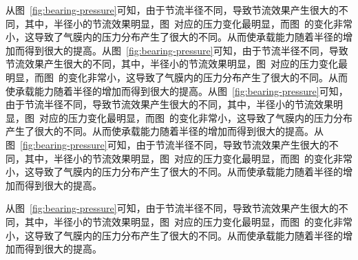 从图~\ref{fig:bearing-pressure}可知，由于节流半径不同，导致节流效果产生很大的不同，其中，半径小的节流效果明显，图~对应的压力变化最明显，而图~的变化非常小，这导致了气膜内的压力分布产生了很大的不同。从而使承载能力随着半径的增加而得到很大的提高。从图~\ref{fig:bearing-pressure}可知，由于节流半径不同，导致节流效果产生很大的不同，其中，半径小的节流效果明显，图~对应的压力变化最明显，而图~的变化非常小，这导致了气膜内的压力分布产生了很大的不同。从而使承载能力随着半径的增加而得到很大的提高。从图~\ref{fig:bearing-pressure}可知，由于节流半径不同，导致节流效果产生很大的不同，其中，半径小的节流效果明显，图~对应的压力变化最明显，而图~的变化非常小，这导致了气膜内的压力分布产生了很大的不同。从而使承载能力随着半径的增加而得到很大的提高。从图~\ref{fig:bearing-pressure}可知，由于节流半径不同，导致节流效果产生很大的不同，其中，半径小的节流效果明显，图~对应的压力变化最明显，而图~的变化非常小，这导致了气膜内的压力分布产生了很大的不同。从而使承载能力随着半径的增加而得到很大的提高。

从图~\ref{fig:bearing-pressure}可知，由于节流半径不同，导致节流效果产生很大的不同，其中，半径小的节流效果明显，图~对应的压力变化最明显，而图~的变化非常小，这导致了气膜内的压力分布产生了很大的不同。从而使承载能力随着半径的增加而得到很大的提高。


